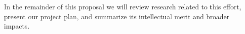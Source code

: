 In the remainder of this proposal we will review research related to this effort, present our project plan, and summarize its intellectual merit and broader impacts.









 


